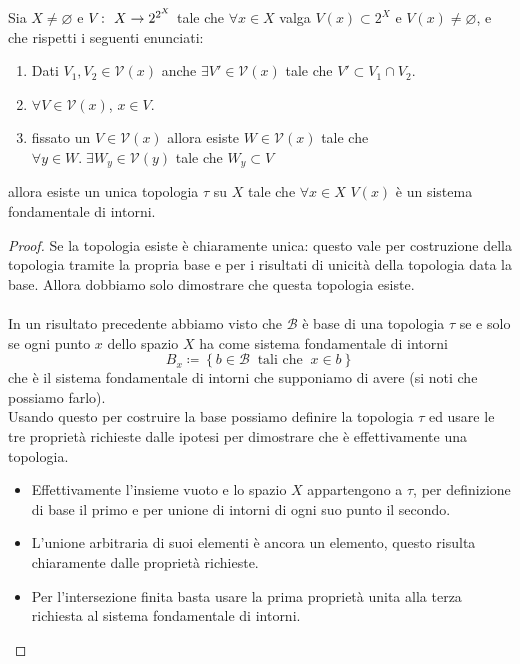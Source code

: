 \begin{theorem}
	\label{thr:sfi_generate_topology}
	Sia $X \neq \varnothing$ e $V \colon\ X \rightarrow 2^{2^X}$ tale che $\forall x \in X$ valga $V(x) \subset 2^X$ e $V(x) \neq \varnothing$, e che rispetti i seguenti enunciati:
	\begin{enumerate}
		\item Dati $V_1, V_2 \in \mathcal{V}(x)$ anche $\exists V' \in \mathcal{V}(x)$ tale che $V' \subset V_1 \cap V_2$.
		\item $\forall V \in \mathcal{V}(x)$, $x \in V$.
		\item fissato un $V \in \mathcal{V}(x)$ allora esiste $W \in \mathcal{V}(x)$ tale che $\forall y \in W.\; \exists W_y \in \mathcal{V}(y)$ tale che $W_y \subset V$
	\end{enumerate}
	allora esiste un unica topologia $\tau$ su $X$ tale che $\forall x \in X$ $V(x)$ è un sistema fondamentale di intorni. 
\end{theorem}
\begin{proof}
	Se la topologia esiste è chiaramente unica: questo vale per costruzione della topologia tramite la propria base e per i risultati di unicità della topologia data la base. Allora dobbiamo solo dimostrare che questa topologia esiste. \\ \\
	In un risultato precedente abbiamo visto che $\mathcal{B}$ è base di una topologia $\tau$ se e solo se ogni punto $x$ dello spazio $X$ ha come sistema fondamentale di intorni 
	\begin{equation*}
	B_x \coloneqq \left\{ b \in \mathcal{B} \ \text{ tali che } \ x \in b \right\}
	\end{equation*}
	che è il sistema fondamentale di intorni che supponiamo di avere (si noti che possiamo farlo). \\ Usando questo per costruire la base possiamo definire la topologia $\tau$ ed usare le tre proprietà richieste dalle ipotesi per dimostrare che è effettivamente una topologia.
	\begin{itemize}
		\item Effettivamente l'insieme vuoto e lo spazio $X$ appartengono a $\tau$, per definizione di base il primo e per unione di intorni di ogni suo punto il secondo.
		\item L'unione arbitraria di suoi elementi è ancora un elemento, questo risulta chiaramente dalle proprietà richieste.
		\item Per l'intersezione finita basta usare la prima proprietà unita alla terza richiesta al sistema fondamentale di intorni.
	\end{itemize}
\end{proof}

